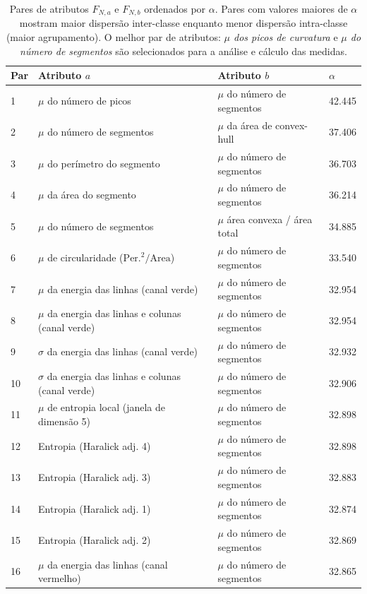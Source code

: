 \begin{table}[ht] \footnotesize
  \begin{center}
  \caption{\label{tab:alpha} Pares de atributos $F_{N, a}$ e $F_{N, b}$
    ordenados por
    $\alpha$. Pares com valores maiores de $\alpha$ mostram maior dispersão
    inter-classe enquanto menor dispersão intra-classe (maior agrupamento).
    O melhor par de atributos: \emph{$\mu$ dos picos de curvatura} e
    \emph{$\mu$ do número de segmentos} são selecionados para a análise e
    cálculo das medidas.}
\begin{tabular}{@{}llll}
 \hline \hline
 Par & Atributo $a$    & Atributo $b$   & $\alpha$ \\ 
 
 \hline
 
 1 & $\mu$ do número de picos & $\mu$ do número de segmentos & 42.445 \\
 2 & $\mu$ do número de segmentos & $\mu$ da área de convex-hull & 37.406 \\
 3 & $\mu$ do perímetro do segmento & $\mu$ do número de segmentos & 36.703 \\
 4 & $\mu$ da área do segmento & $\mu$ do número de segmentos & 36.214 \\
 5 & $\mu$ do número de segmentos & $\mu$ área convexa / área total & 34.885 \\
 6 & $\mu$ de circularidade ($\mathrm{Per.}^2/\mathrm{Area}$) & $\mu$ do número
 de segmentos & 33.540 \\
 7 & $\mu$ da energia das linhas (canal verde) & $\mu$ do número de segmentos & 32.954 \\
 8 & $\mu$ da energia das linhas e colunas (canal verde) & $\mu$ do número de segmentos & 32.954 \\
 9 & $\sigma$ da energia das linhas (canal verde) & $\mu$ do número de segmentos & 32.932 \\
 10 & $\sigma$ da energia das linhas e colunas (canal verde) & $\mu$ do número
 de segmentos & 32.906 \\
 11 & $\mu$ de entropia local (janela de dimensão 5) & $\mu$ do número de segmentos & 32.898 \\
 12 & Entropia (Haralick adj. 4) & $\mu$ do número de segmentos & 32.898 \\
 13 & Entropia (Haralick adj. 3) & $\mu$ do número de segmentos & 32.883 \\
 14 & Entropia (Haralick adj. 1) & $\mu$ do número de segmentos & 32.874 \\
 15 & Entropia (Haralick adj. 2) & $\mu$ do número de segmentos & 32.869 \\
 16 & $\mu$ da energia das linhas (canal vermelho) & $\mu$ do número de segmentos & 32.865 \\
\hline \hline
 \end{tabular}
\end{center}
\end{table}

